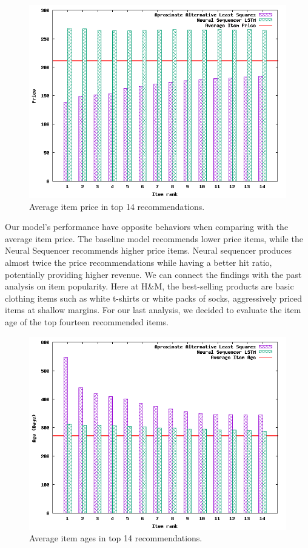 \documentclass{kththesis}
\begin{document}
\begin{figure}[H]
    \centering
    \includegraphics[scale=0.75]{charts/price.png}
    \caption{Average item price in top 14 recommendations.}
\end{figure}

Our model's performance have opposite behaviors when comparing with the average item price. The baseline model recommends lower price items, while the Neural Sequencer recommends higher price items. Neural sequencer produces almost twice the price recommendations while having a better hit ratio, potentially providing higher revenue. We can connect the findings with the past analysis on item popularity. Here at H\&M, the best-selling products are basic clothing items such as white t-shirts or white packs of socks, aggressively priced items at shallow margins. For our last analysis, we decided to evaluate the item age of the top fourteen recommended items.

\begin{figure}[H]
    \centering
    \includegraphics[scale=0.75]{charts/ages.png}
    \caption{Average item ages in top 14 recommendations.}
\end{figure}
\end{document}
